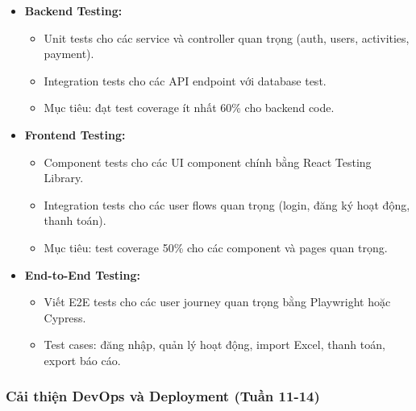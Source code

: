\begin{itemize}
    \item \textbf{Backend Testing:}
    \begin{itemize}
        \item Unit tests cho các service và controller quan trọng (auth, users, activities, payment).
        \item Integration tests cho các API endpoint với database test.
        \item Mục tiêu: đạt test coverage ít nhất 60\% cho backend code.
    \end{itemize}
    
    \item \textbf{Frontend Testing:}
    \begin{itemize}
        \item Component tests cho các UI component chính bằng React Testing Library.
        \item Integration tests cho các user flows quan trọng (login, đăng ký hoạt động, thanh toán).
        \item Mục tiêu: test coverage 50\% cho các component và pages quan trọng.
    \end{itemize}
    
    \item \textbf{End-to-End Testing:}
    \begin{itemize}
        \item Viết E2E tests cho các user journey quan trọng bằng Playwright hoặc Cypress.
        \item Test cases: đăng nhập, quản lý hoạt động, import Excel, thanh toán, export báo cáo.
    \end{itemize}
\end{itemize}

\subsubsection{Cải thiện DevOps và Deployment (Tuần 11-14)}

